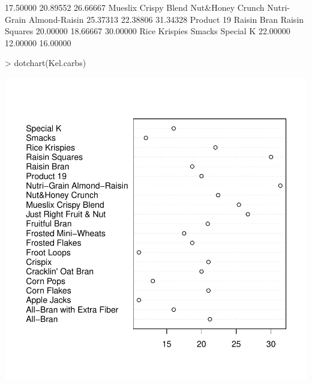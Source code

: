 \documentclass[12pt,letterpaper,final]{article}
\begin{document}
\begin{Schunk}
\begin{Soutput}
                 17.50000                  20.89552                  26.66667 
     Mueslix Crispy Blend          Nut&Honey Crunch Nutri-Grain Almond-Raisin 
                 25.37313                  22.38806                  31.34328 
               Product 19               Raisin Bran            Raisin Squares 
                 20.00000                  18.66667                  30.00000 
            Rice Krispies                    Smacks                 Special K 
                 22.00000                  12.00000                  16.00000 
\end{Soutput}
\begin{Sinput}
> dotchart(Kel.carbs)
\end{Sinput}
\end{Schunk}
\includegraphics{lect_main-017}
\end{document}
